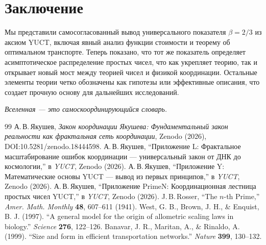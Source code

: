 \documentclass[11pt,a4paper]{article}
\begin{document}
	\section{Заключение}
	Мы представили самосогласованный вывод универсального показателя \(\beta = 2/3\) из аксиом YUCT, включая явный анализ функции стоимости и теорему об оптимальном транспорте. Теперь показано, что тот же показатель определяет асимптотическое распределение простых чисел, что как укрепляет теорию, так и открывает новый мост между теорией чисел и физикой координации. Остальные элементы теории четко обозначены как гипотезы или эффективные описания, что создает прочную основу для дальнейших исследований.
	
	\begin{center}
		\textit{Вселенная — это самоскоординирующийся словарь.}
	\end{center}
	
	\begin{thebibliography}{99}
		А.\,В.\,Якушев, \emph{Закон координации Якушева: Фундаментальный закон реальности как фрактальная сеть координации}, Zenodo (2026), DOI:10.5281/zenodo.18444598.
		А.\,В.\,Якушев, ``Приложение L: Фрактальное масштабирование ошибок координации — универсальный закон от ДНК до космологии,'' в \emph{YUCT}, Zenodo (2026).
		А.\,В.\,Якушев, ``Приложение Y: Математические основы YUCT — вывод из первых принципов,'' в \emph{YUCT}, Zenodo (2026).
		А.\,В.\,Якушев, ``Приложение PrimeN: Координационная лестница простых чисел YUCT,'' в \emph{YUCT}, Zenodo (2026).
		J.\,B.\,Rosser, ``The \(n\)-th Prime,'' \emph{Amer. Math. Monthly} \textbf{48}, 607--611 (1941).
		West, G. B., Brown, J. H., \& Enquist, B. J. (1997). ``A general model for the origin of allometric scaling laws in biology.'' \emph{Science} \textbf{276}, 122--126.
		Banavar, J. R., Maritan, A., \& Rinaldo, A. (1999). ``Size and form in efficient transportation networks.'' \emph{Nature} \textbf{399}, 130--132.
	\end{thebibliography}
	
\end{document}

